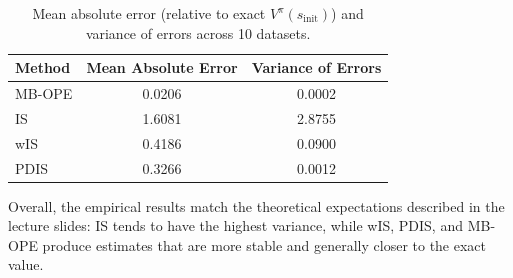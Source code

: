 \begin{table}[h!]
\centering
\begin{tabular}{l|cc}
\hline
\textbf{Method} & \textbf{Mean Absolute Error} & \textbf{Variance of Errors} \\
\hline
MB-OPE & 0.0206 & 0.0002 \\
IS     & 1.6081 & 2.8755 \\
wIS    & 0.4186 & 0.0900 \\
PDIS   & 0.3266 & 0.0012 \\
\hline
\end{tabular}
\caption{Mean absolute error (relative to exact $V^\pi(s_{\text{init}})$) and variance of errors across 10 datasets.}
\label{tab:error-comparison}
\end{table}

Overall, the empirical results match the theoretical expectations described in the lecture slides: IS tends to have the highest variance, while wIS, PDIS, and MB-OPE produce estimates that are more stable and generally closer to the exact value.
